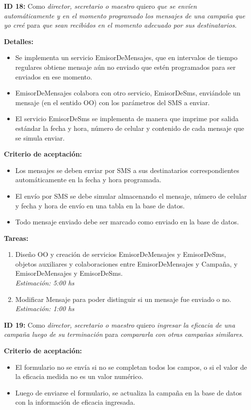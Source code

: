 \documentclass[a4paper, 10pt, twoside]{article}
\newcommand{\sprintstory}[4]{
  \noindent
  \textbf{ID #1:} Como \emph{#2} quiero \emph{#3} para \emph{#4}.
}
\newenvironment{detalles}{
  \textbf{Detalles:}
  \begin{itemize}
}{
  \end{itemize}
}
\newcommand{\detalle}[1] {
  \item #1.
}
\newenvironment{criterios}{
  \textbf{Criterio de aceptación:}
  \begin{itemize}
}{
  \end{itemize}
}
\newcommand{\criterio}[1] {
  \item #1
}
\newenvironment{tasks}{
  \textbf{Tareas:}
  \begin{enumerate}
}{
  \end{enumerate}
}
\newcommand{\task}[2] {
  \item #1.\\
  \emph{Estimación: #2 hs}
}
\begin{document}
\sprintstory{18}
            {director, secretario o maestro}
            {que se envíen automáticamente y en el momento programado los mensajes de una campaña que yo creé}
            {que sean recibidos en el momento adecuado por sus destinatarios}

\begin{detalles}
  \detalle{Se implementa un servicio EmisorDeMensajes, que en intervalos de tiempo regulares obtiene mensaje aún no enviado que estén programados para ser enviados en ese momento}
  \detalle{EmisorDeMensajes colabora con otro servicio, EmisorDeSms, enviándole un mensaje (en el sentido OO) con los parámetros del SMS a enviar}
  \detalle{El servicio EmisorDeSms se implementa de manera que imprime por salida estándar la fecha y hora, número de celular y contenido de cada mensaje que se simula enviar}
\end{detalles}

\begin{criterios}
  \criterio{Los mensajes se deben enviar por SMS a sus destinatarios correspondientes automáticamente en la fecha y hora programada.}
  \criterio{El envío por SMS se debe simular almacenando el mensaje, número de celular y fecha y hora de envío en una tabla en la base de datos.}
  \criterio{Todo mensaje enviado debe ser marcado como enviado en la base de datos.}
\end{criterios}

\begin{tasks}
  \task{Diseño OO y creación de servicios EmisorDeMensajes y EmisorDeSms, objetos auxiliares y colaboraciones entre EmisorDeMensajes y Campaña, y EmisorDeMensajes y EmisorDeSms}{5:00}
  \task{Modificar Mensaje para poder distinguir si un mensaje fue enviado o no}{1:00}
\end{tasks}


\sprintstory{19}
            {director, secretario o maestro}
            {ingresar la eficacia de una campaña luego de su terminación}
            {compararla con otras campañas similares}

\begin{criterios}
  \criterio{El formulario no se envía si no se completan todos los campos, o si el valor de la eficacia medida no es un valor numérico.}
  \criterio{Luego de enviarse el formulario, se actualiza la campaña en la base de datos con la información de eficacia ingresada.}
\end{criterios}
\end{document}
